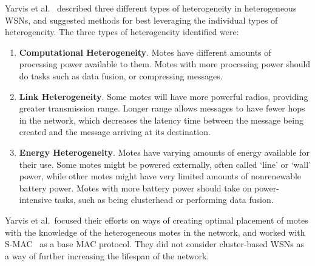 Yarvis et al.~\cite{exploitHetero} described three different types of heterogeneity in 
heterogeneous WSNs, and suggested methods for best leveraging the individual 
types of heterogeneity.
The three types of heterogeneity identified were:
\begin{enumerate}
	\item \textbf{Computational Heterogeneity}. Motes have different amounts of processing power 
	available to them. Motes with more processing power should do tasks such as data fusion, or compressing messages.
	\item \textbf{Link Heterogeneity}. Some motes will have more powerful radios, providing 
	greater transmission range. Longer range allows messages to have fewer hops in the network,
	which decreases the latency time between the message being created and the message arriving 
	at its destination.
	\item \textbf{Energy Heterogeneity}. Motes have varying amounts of energy available for their use. Some motes might
	be powered externally, often called `line' or `wall' power, while other motes might have very limited
	amounts of nonrenewable battery power. Motes with more battery power should take on power-intensive tasks, 
	such as being clusterhead or performing data fusion.
\end{enumerate}
Yarvis et al.\ focused their efforts on ways of creating optimal placement of motes
with the knowledge of the heterogeneous motes in the network, and worked with S-MAC~\cite{smac} as a base
MAC protocol. They did not consider cluster-based WSNs as a way of further increasing the 
lifespan of the network.

